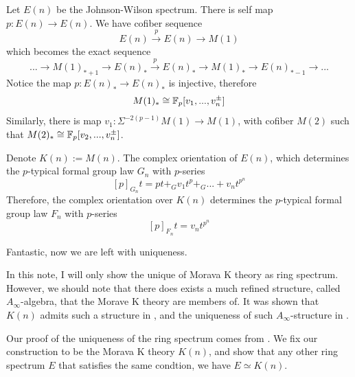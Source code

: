Let $E(n)$ be the Johnson-Wilson spectrum. There is self map $p: E(n)\to E(n)$. We have cofiber sequence
\[
E(n)\xrightarrow{p} E(n)\to M(1)
\]which becomes the exact sequence
\[
... \to M(1)_{*+1} \to E(n)_*\xrightarrow{p} E(n)_*\to M(1)_*\to E(n)_{*-1}\to ...
\]
Notice the map $p:E(n)_*\to E(n)_*$ is injective, therefore 
\[
  M(1)_*\cong \mathbb{F}_p[v_1,...,v_n^{\pm}]
\]
Similarly, there is map $v_1: \Sigma^{-2(p-1)}M(1)\to M(1)$, with cofiber $M(2)$ such that $M(2)_*\cong \mathbb{F}_p[v_2,...,v_n^{\pm}]$. 

Denote $K(n):=M(n)$. The complex orientation of $E(n)$, which determines the $p$-typical formal group law $G_n$ with $p$-series 
\[
[p]_{G_n} t=pt+_Gv_1t^p+_G...+v_nt^{p^n}
\]Therefore, the complex orientation over $K(n)$ determines the $p$-typical formal group law $F_n$ with $p$-series
\[
[p]_{F_n}t=v_nt^{p^n}
\]

Fantastic, now we are left with uniqueness.

In this note, I will only show the unique of Morava K theory as ring spectrum. However, we should note that there does exists a much 
refined structure, called $A_{\infty}$-algebra, that the Morave K theory are members of. It was shown that $K(n)$ admits such a structure 
in \cite{ChrRobinson}, and the uniqueness of such $A_{\infty}$-structure in \cite{ChrAngeltveit}.

Our proof of the uniqueness of the ring spectrum comes from \cite{ChrLurie}. We fix our construction to be the Morava K theory $K(n)$, and 
show that any other ring spectrum $E$ that satisfies the same condtion, we have $E\simeq K(n)$.

